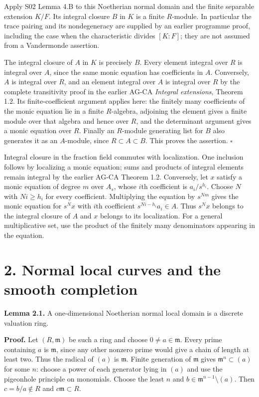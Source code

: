 \documentclass[11pt,a4paper,openany]{report}
\begin{document}
Apply S02 Lemma 4.B to this Noetherian normal domain and the finite separable extension \(K/F\). Its integral closure \(B\) in \(K\) is a finite \(R\)-module. In particular the trace pairing and its nondegeneracy are supplied by an earlier programme proof, including the case when the characteristic divides \([K:F]\); they are not assumed from a Vandermonde assertion.

The integral closure of \(A\) in \(K\) is precisely \(B\). Every element integral over \(R\) is integral over \(A\), since the same monic equation has coefficients in \(A\). Conversely, \(A\) is integral over \(R\), and an element integral over \(A\) is integral over \(R\) by the complete transitivity proof in the earlier AG-CA \emph{Integral extensions}, Theorem 1.2. Its finite-coefficient argument applies here: the finitely many coefficients of the monic equation lie in a finite \(R\)-algebra, adjoining the element gives a finite module over that algebra and hence over \(R\), and the determinant argument gives a monic equation over \(R\). Finally an \(R\)-module generating list for \(B\) also generates it as an \(A\)-module, since \(R\subset A\subset B\). This proves the assertion. \(\square\)

Integral closure in the fraction field commutes with localization. One inclusion follows by localizing a monic equation; sums and products of integral elements remain integral by the earlier AG-CA Theorem 1.2. Conversely, let \(x\) satisfy a monic equation of degree \(m\) over \(A_s\), whose \(i\)th coefficient is \(a_i/s^{h_i}\). Choose \(N\) with \(Ni\ge h_i\) for every coefficient. Multiplying the equation by \(s^{Nm}\) gives the monic equation for \(s^Nx\) with \(i\)th coefficient \(s^{Ni-h_i}a_i\in A\). Thus \(s^Nx\) belongs to the integral closure of \(A\) and \(x\) belongs to its localization. For a general multiplicative set, use the product of the finitely many denominators appearing in the equation.

\section{2. Normal local curves and the smooth completion}\label{AG-RG-S03-normal-local-curves-and-the-smooth-completion}

\textbf{Lemma 2.1.} A one-dimensional Noetherian normal local domain is a discrete valuation ring.

\textbf{Proof.} Let \((R,\mathfrak m)\) be such a ring and choose \(0\ne a\in\mathfrak m\). Every prime containing \(a\) is \(\mathfrak m\), since any other nonzero prime would give a chain of length at least two. Thus the radical of \((a)\) is \(\mathfrak m\). Finite generation of \(\mathfrak m\) gives \(\mathfrak m^n\subset(a)\) for some \(n\): choose a power of each generator lying in \((a)\) and use the pigeonhole principle on monomials. Choose the least \(n\) and \(b\in\mathfrak m^{n-1}\setminus(a)\). Then \(c=b/a\notin R\) and \(c\mathfrak m\subset R\).
\end{document}
